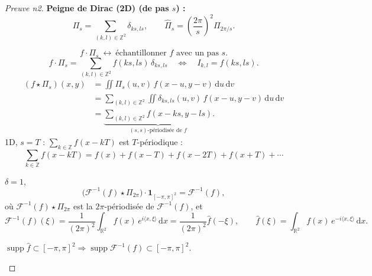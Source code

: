\begin{proof}[Preuve n2]
  \textbf{Peigne de Dirac (2D) (de pas $s$) :}
  \[
    \Pi_s=\sum_{(k,l)\in\mathbb{Z}^2}\delta_{ks,ls},
    \qquad
    \hat\Pi_s=\left(\frac{2\pi}{s}\right)^{2}\Pi_{2\pi/s}.
  \]
  \begin{figure}[!h]\centering
    
  \end{figure}
  \[
    \boxed{f\cdot\Pi_s}\ \longleftrightarrow\ \text{échantillonner }f\text{ avec un pas }s.
  \]
  \[
    f\cdot\Pi_s=\sum_{(k,l)\in\mathbb{Z}^2}f(ks,ls)\,\delta_{ks,ls}
    \quad\Longleftrightarrow\quad I_{k,l}=f(ks,ls).
  \]
  \begin{align*}
    (f\star\Pi_s)(x,y)&=\iint\Pi_s(u,v)\,f(x-u,y-v)\,\mathrm{d}u\,\mathrm{d}v\\
    &=\sum_{(k,l)\in\mathbb{Z}^2}\iint\delta_{ks,ls}(u,v)\,f(x-u,y-v)\,\mathrm{d}u\,\mathrm{d}v\\
    &=\underbrace{\sum_{(k,l)\in\mathbb{Z}^2}f(x-ks,y-ls)}_{(s,s)\text{-périodisée de }f}.
  \end{align*}
  1D, $s=T$ : $\sum_{k\in\mathbb{Z}}f(x-kT)$ est $T$-périodique :
  \[
    \sum_{k\in\mathbb{Z}}f(x-kT)=f(x)+f(x-T)+f(x-2T)+f(x+T)+\cdots
  \]
  \begin{figure}[!h]\centering
    
  \end{figure}
  $\delta=1$,
  \[
    \big(\mathcal{F}^{-1}(f)\star\Pi_{2\pi}\big)\cdot\mathbf{1}_{[-\pi,\pi]^2}=\mathcal{F}^{-1}(f),
  \]
  où $\mathcal{F}^{-1}(f)\star\Pi_{2\pi}$ est la $2\pi$-périodisée de $\mathcal{F}^{-1}(f)$, et
  \[
    \mathcal{F}^{-1}(f)(\xi)=\frac1{(2\pi)^2}\int_{\mathbb{R}^2}f(x)\,e^{i\langle x,\xi\rangle}\,\mathrm{d}x=\frac1{(2\pi)^2}\hat f(-\xi),
    \qquad
    \hat f(\xi)=\int_{\mathbb{R}^2}f(x)\,e^{-i\langle x,\xi\rangle}\,\mathrm{d}x.
  \]
  
  $\operatorname{supp}\hat f\subset[-\pi,\pi]^2\Rightarrow\operatorname{supp}\mathcal{F}^{-1}(f)\subset[-\pi,\pi]^2$.
 
  \begin{figure}[!h]\centering
    
  \end{figure}
 

\end{proof}
